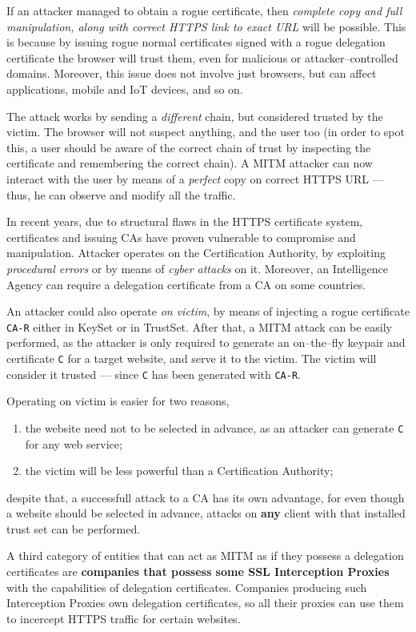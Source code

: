 \documentclass[10pt]{\classname}
\begin{document}
If an attacker managed to obtain a rogue certificate, then \emph{complete copy
and full manipulation, along with correct HTTPS link to exact URL} will be
possible. This is because by issuing rogue normal certificates signed with a
rogue delegation certificate the browser will trust them, even for malicious or
attacker\---controlled domains. Moreover, this issue does not involve just
browsers, but can affect applications, mobile and IoT devices, and so on.

The attack works by sending a \emph{different} chain, but considered trusted by
the victim. The browser will not suspect anything, and the user too (in order
to spot this, a user should be aware of the correct chain of trust by
inspecting the certificate and remembering the correct chain). A MITM attacker
can now interact with the user by means of a \emph{perfect} copy on correct
HTTPS URL --- thus, he can observe and modify all the traffic.

In recent years, due to structural flaws in the HTTPS certificate system,
certificates and issuing CAs have proven vulnerable to compromise and
manipulation. Attacker operates on the Certification Authority, by exploiting
\emph{procedural errors} or by means of \emph{cyber attacks} on it. Moreover,
an Intelligence Agency can require a delegation certificate from a CA on some
countries.

An attacker could also operate \emph{on victim}, by means of injecting a rogue
certificate \texttt{CA-R} either in KeySet or in TrustSet. After that, a MITM
attack can be easily performed, as the attacker is only required to generate an
on--the--fly keypair and certificate \texttt{C} for a target website, and serve
it to the victim. The victim will consider it trusted --- since \texttt{C} has
been generated with \texttt{CA-R}.

Operating on victim is easier for two reasons,
\begin{enumerate}
    \item the website need not to be selected in advance, as an attacker can
        generate \texttt{C} for any web service;
    \item the victim will be less powerful than a Certification Authority;
\end{enumerate}
despite that, a successfull attack to a CA has its own advantage, for even
though a website should be selected in advance, attacks on \textbf{any} client
with that installed trust set can be performed.

A third category of entities that can act as MITM as if they possess a
delegation certificates are \textbf{companies that possess some SSL
Interception Proxies} with the capabilities of delegation certificates.
Companies producing such Interception Proxies own delegation certificates, so
all their proxies can use them to incercept HTTPS traffic for certain websites.
\end{document}
